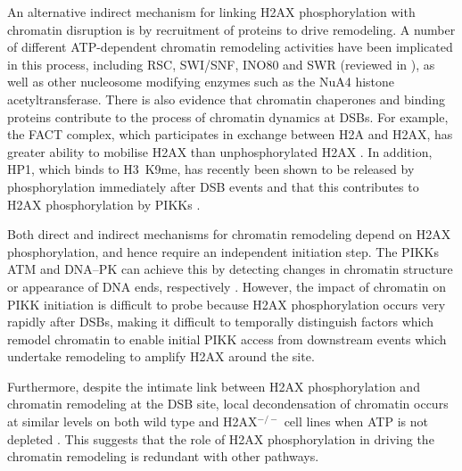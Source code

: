 An alternative indirect mechanism for linking H2AX phosphorylation
with chromatin disruption is by recruitment of proteins to drive
remodeling. A number of different ATP-dependent chromatin remodeling
activities have been implicated in this process, including RSC,
SWI/SNF, INO80 and SWR (reviewed in \citet{JAD07}), as well as other
nucleosome modifying enzymes such as the NuA4 histone
acetyltransferase. There is also evidence that chromatin chaperones
and binding proteins contribute to the process of chromatin dynamics
at DSBs. For example, the FACT complex, which participates in exchange
between H2A and H2AX, has greater ability to mobilise \textgamma H2AX
than unphosphorylated H2AX \citep{KHHK+08}. In addition, HP1\textbeta,
which binds to H3~K9me, has recently been shown to be released by
phosphorylation immediately after DSB events and that this contributes
to H2AX phosphorylation by PIKKs \citep{AJB+08}.

Both direct and indirect mechanisms for chromatin remodeling depend on
H2AX phosphorylation, and hence require an independent initiation
step. The PIKKs ATM and DNA--PK can achieve this by detecting changes
in chromatin structure or appearance of DNA ends, respectively
\citep{CJB03,BC04}.
However, the impact of chromatin on PIKK initiation is difficult to
probe because H2AX phosphorylation occurs very rapidly after DSBs,
making it difficult to temporally distinguish factors which remodel
chromatin to enable initial PIKK access from downstream events which
undertake remodeling to amplify \textgamma H2AX around the site.

Furthermore, despite the intimate link between H2AX phosphorylation
and chromatin remodeling at the DSB site, local decondensation of
chromatin occurs at similar levels on both wild type and H2AX$^{-/-}$
cell lines when ATP is not depleted \citep{MJK+06}. This suggests that
the role of H2AX phosphorylation in driving the chromatin remodeling
is redundant with other pathways.

